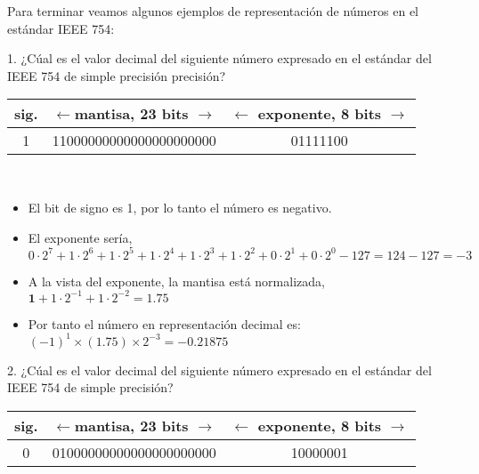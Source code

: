 \begin{paracol}{2}
Para terminar veamos algunos ejemplos de representación de números en el estándar IEEE 754:

1. ¿Cúal es el valor decimal del siguiente número expresado en el estándar del IEEE 754 de simple precisión precisión?
\end{paracol}
\begin{tabular}{|c||c||c|}
\hline
sig.&$\leftarrow$mantisa, 23 bits $\rightarrow$&$\leftarrow$ exponente, 8 bits $\rightarrow$\\
\hline
1&11000000000000000000000&01111100\\
\hline
\end{tabular}\\
\begin{paracol}{2}
\begin{itemize}[leftmargin=\dimexpr 26pt-.25in]
\item El bit de signo es 1, por lo tanto el número es negativo.
\item El exponente sería, $0\cdot2^7+1\cdot2^6+1\cdot2^5+1\cdot2^4+1\cdot2^3+1\cdot2^2+0\cdot2^1+0\cdot2^0-127=124-127=-3$
\item A la vista del exponente, la mantisa está normalizada, $\mathbf{1}+1\cdot2^{-1}+1\cdot2^{-2}=1.75$
\item Por tanto el número en representación decimal es: $ (-1)^1\times(1.75)\times2^{-3}=-0.21875$
\end{itemize}

2. ¿Cúal es el valor decimal del siguiente número expresado en el estándar del IEEE 754 de simple precisión?
\end{paracol}
\begin{tabular}{|c||c||c|}
\hline
sig.&$\leftarrow$mantisa, 23 bits $\rightarrow$&$\leftarrow$ exponente, 8 bits $\rightarrow$\\
\hline
0&01000000000000000000000&10000001\\
\hline
\end{tabular}\\
